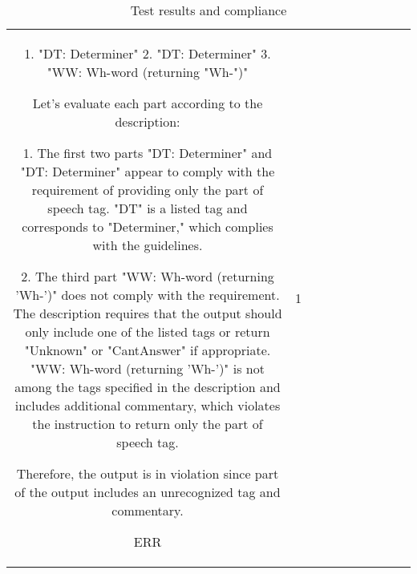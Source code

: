 \begin{table}[h!]
\begin{tabular}{|c|c|c|c|c|c|c|c|c|c|}
1. "DT: Determiner"
2. "DT: Determiner"
3. "WW: Wh-word (returning "Wh-")"

Let's evaluate each part according to the description:

1. The first two parts "DT: Determiner" and "DT: Determiner" appear to comply with the requirement of providing only the part of speech tag. "DT" is a listed tag and corresponds to "Determiner," which complies with the guidelines.

2. The third part "WW: Wh-word (returning 'Wh-')" does not comply with the requirement. The description requires that the output should only include one of the listed tags or return "Unknown" or "CantAnswer" if appropriate. "WW: Wh-word (returning 'Wh-')" is not among the tags specified in the description and includes additional commentary, which violates the instruction to return only the part of speech tag.

Therefore, the output is in violation since part of the output includes an unrecognized tag and commentary.

ERR & 1
  \end{tabular}
  \caption{Test results and compliance}
  
  \end{table}
  